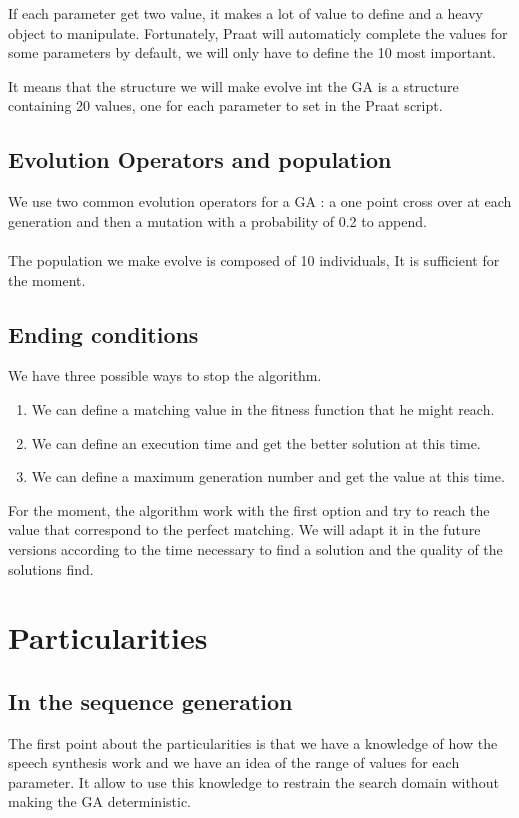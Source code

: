 \documentclass[12pt]{report}
\begin{document}
If each parameter get two value, it makes a lot of value to define and a heavy object to manipulate. Fortunately, Praat will automaticly complete the values for some parameters by default, we will only have to define the 10 most important.

It means that the structure we will make evolve int the GA is a structure containing 20 values, one for each parameter to set in the Praat script.

\subsection{Evolution Operators and population}
We use two common evolution operators for a GA : a one point cross over at each generation and then a mutation with a probability of 0.2 to append.

\paragraph*{}
The population we make evolve is composed of 10 individuals, It is sufficient for the moment.

\subsection{Ending conditions}
We have three possible ways to stop the algorithm. 
\begin{enumerate}
\item We can define a matching value in the fitness function that he might reach.
\item We can define an execution time and get the better solution at this time.
\item We can define a maximum generation number and get the value at this time.
\end{enumerate}

For the moment, the algorithm work with the first option and try to reach the value that correspond to the 
perfect matching. We will adapt it in the future versions according to the time necessary to find a solution and the quality of the solutions find.

\section{Particularities}

\subsection{In the sequence generation}
The first point about the particularities is that we have a knowledge of how the speech synthesis work and we have an idea of the range of values for each parameter. It allow to use this knowledge to restrain the search domain without making the GA deterministic.
\end{document}

